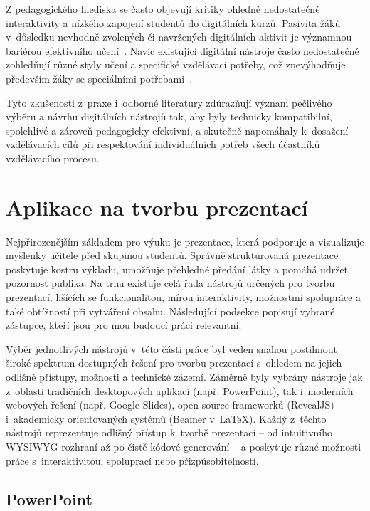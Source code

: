 Z pedagogického hlediska se často objevují kritiky ohledně nedostatečné interaktivity a nízkého zapojení studentů do digitálních kurzů.
Pasivita žáků v~důsledku nevhodně zvolených či navržených digitálních aktivit je významnou bariérou efektivního učení~\cite{edsembli2020}. 
Navíc existující digitální nástroje často nedostatečně zohledňují různé styly učení a specifické vzdělávací potřeby, což znevýhodňuje především žáky se speciálními potřebami~\cite{altamira2025}.

Tyto zkušenosti z~praxe i~odborné literatury zdůrazňují význam pečlivého výběru a návrhu digitálních nástrojů tak, aby byly technicky kompatibilní, spolehlivé a zároveň pedagogicky efektivní, a skutečně napomáhaly k~dosažení vzdělávacích cílů při respektování individuálních potřeb všech účastníků vzdělávacího procesu.

\section{Aplikace na tvorbu prezentací}\label{text:analyza/prezentace}

Nejpřirozenějším základem pro výuku je prezentace, která podporuje a vizualizuje myšlenky učitele před skupinou studentů.
Správně strukturovaná prezentace poskytuje kostru výkladu, umožňuje přehledné předání látky a pomáhá udržet pozornost publika.
Na trhu existuje celá řada nástrojů určených pro tvorbu prezentací, lišících se funkcionalitou, mírou interaktivity, možnostmi spolupráce a také obtížností při vytváření obsahu.
Následující podsekce popisují vybrané zástupce, kteří jsou pro mou budoucí práci relevantní.

Výběr jednotlivých nástrojů v~této části práce byl veden snahou postihnout široké spektrum dostupných řešení pro tvorbu prezentací s~ohledem na jejich odlišné přístupy, možnosti a technické zázemí. 
Záměrně byly vybrány nástroje jak z~oblasti tradičních desktopových aplikací (např. PowerPoint), tak i~moderních webových řešení (např. Google Slides), open-source frameworků (RevealJS) i~akademicky orientovaných systémů (Beamer v~\LaTeX). 
Každý z~těchto nástrojů reprezentuje odlišný přístup k~tvorbě prezentací -- od intuitivního WYSIWYG rozhraní až po čistě kódové generování -- a poskytuje různé možnosti práce s~interaktivitou, spoluprací nebo přizpůsobitelností.

\subsection{PowerPoint}

